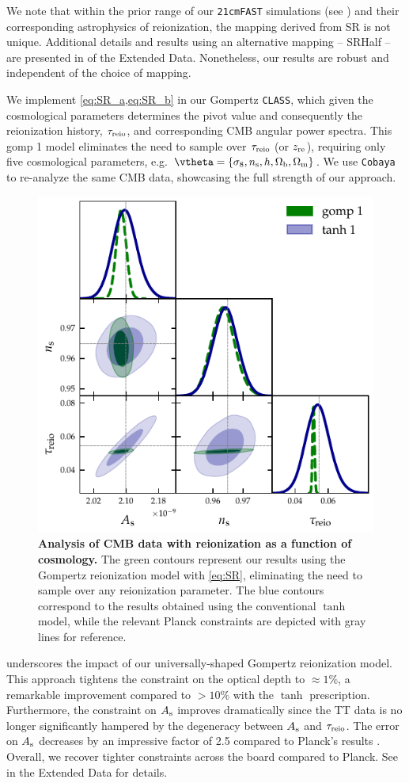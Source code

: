 We note that within the prior range of our \texttt{21cmFAST} simulations
(see ) and their corresponding astrophysics of
reionization, the mapping derived from SR is not unique.
Additional details and results using an alternative mapping -- SRHalf -- are
presented in  of the Extended Data.
Nonetheless, our results are robust and independent of the choice of
mapping.

We implement \cref{eq:SR_a,eq:SR_b} in our Gompertz \texttt{CLASS}, which given
the cosmological parameters determines the pivot value and consequently
the reionization history, $\tau_{\mathrm{reio}}$, and corresponding CMB angular
power spectra.
This gomp 1 model eliminates the need to sample over $\tau_{\mathrm{reio}}$ (or $z_{\mathrm{re}}$),
requiring only five cosmological parameters, e.g. $\vtheta = \{ \sigma_8,
\ns, h, \Omegab, \Omegam\}$.
We use \texttt{Cobaya} to re-analyze the same CMB data,
showcasing the full strength of our approach.

\begin{figure}[tb]
\centering
\includegraphics[width=0.7\linewidth]{figs/gomp_tanh_triangle_kill.pdf}
\caption{\textbf{Analysis of CMB data with reionization as a function of
cosmology.}
The green contours represent our results using the Gompertz reionization
model with \cref{eq:SR}, eliminating the need to sample over any
reionization parameter.
The blue contours correspond to the results obtained using the
conventional $\tanh$ model, while the relevant Planck constraints
\cite{Planck2020a} are depicted with gray lines for reference.}
\label{fig:kill}
\end{figure}

 underscores the impact of our universally-shaped
Gompertz reionization model. This approach tightens the constraint on the optical depth to $\approx
1\%$, a remarkable improvement compared to $> 10\%$ with the $\tanh$
prescription.
Furthermore, the constraint on $A_\mathrm{s}$ improves dramatically since the TT
data is no longer significantly hampered by the degeneracy between $A_\mathrm{s}$
and $\tau_{\mathrm{reio}}$.
The error on $A_\mathrm{s}$ decreases by an impressive factor of 2.5 compared to
Planck's results \cite{Planck2020a}.
Overall, we recover tighter constraints across the board compared to
Planck.
See  in the Extended Data for details.

